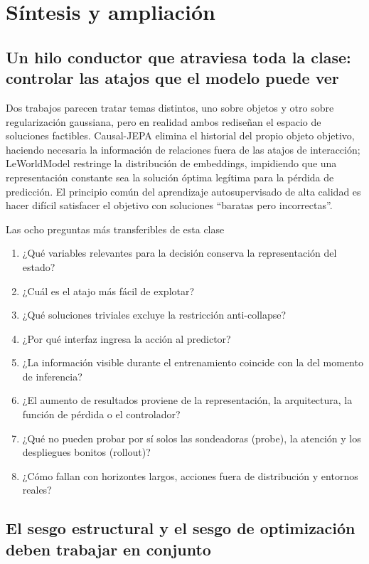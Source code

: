 \section{Síntesis y ampliación}

\subsection{Un hilo conductor que atraviesa toda la clase: controlar las atajos que el modelo puede ver}

Dos trabajos parecen tratar temas distintos, uno sobre objetos y otro sobre regularización gaussiana, pero en realidad ambos rediseñan el espacio de soluciones factibles. Causal-JEPA elimina el historial del propio objeto objetivo, haciendo necesaria la información de relaciones fuera de las atajos de interacción; LeWorldModel restringe la distribución de embeddings, impidiendo que una representación constante sea la solución óptima legítima para la pérdida de predicción. El principio común del aprendizaje autosupervisado de alta calidad es hacer difícil satisfacer el objetivo con soluciones ``baratas pero incorrectas''.

\begin{importantbox}{Las ocho preguntas más transferibles de esta clase}
\begin{enumerate}
  \item ¿Qué variables relevantes para la decisión conserva la representación del estado?
  \item ¿Cuál es el atajo más fácil de explotar?
  \item ¿Qué soluciones triviales excluye la restricción anti-collapse?
  \item ¿Por qué interfaz ingresa la acción al predictor?
  \item ¿La información visible durante el entrenamiento coincide con la del momento de inferencia?
  \item ¿El aumento de resultados proviene de la representación, la arquitectura, la función de pérdida o el controlador?
  \item ¿Qué no pueden probar por sí solos las sondeadoras (probe), la atención y los despliegues bonitos (rollout)?
  \item ¿Cómo fallan con horizontes largos, acciones fuera de distribución y entornos reales?
\end{enumerate}
\end{importantbox}

\subsection{El sesgo estructural y el sesgo de optimización deben trabajar en conjunto}

